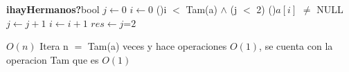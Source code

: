 \begin{Algoritmos}
\begin{algoritmo}{\textbf{ihayHermanos?}}{}{bool}
    $j \gets 0 $ 
    $i \gets 0 $ 
	\While(){i $<$ Tam(a) $\land$ (j $<$ 2)}{
    	  \If(){$a[i]$ $\neq$ NULL}{
      			 $j \gets j + 1$ 
  		}
        $i \gets i + 1$ 
     }
     $res \gets j $=$ 2 $ 
\end{algoritmo}
\datosAlgoritmo{} %
  {} %
  {} %
  {$O(n)$} %
  {Itera n $=$ Tam(a) veces y hace operaciones $O(1)$, se cuenta con la operacion Tam que es $O(1)$} %

\end{Algoritmos}
